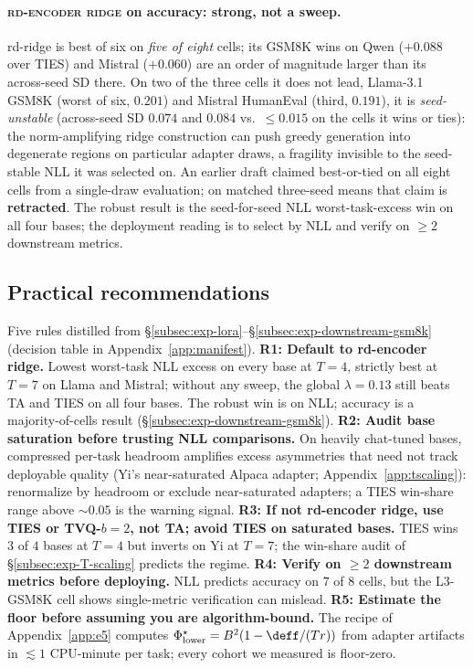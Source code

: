 \paragraph{\textsc{rd-encoder ridge} on accuracy: strong, not a
sweep.} rd-ridge is best of six on \emph{five of eight} cells; its
GSM8K wins on Qwen ($+0.088$ over TIES) and Mistral ($+0.060$) are an
order of magnitude larger than its across-seed SD there. On two of the
three cells it does not lead, Llama-3.1 GSM8K (worst of six,
$0.201$) and Mistral HumanEval (third, $0.191$), it is
\emph{seed-unstable} (across-seed SD $0.074$ and $0.084$ vs.\
$\leq 0.015$ on the cells it wins or ties): the norm-amplifying ridge
construction can push greedy generation into degenerate regions on
particular adapter draws, a fragility invisible to the seed-stable NLL
it was selected on. An earlier draft claimed best-or-tied on all eight
cells from a single-draw evaluation; on matched three-seed means that
claim is \textbf{retracted}. The robust result is the seed-for-seed
NLL worst-task-excess win on all four bases; the deployment reading is
to select by NLL and verify on $\geq 2$ downstream metrics.

\subsection{Practical recommendations}
\label{sec:practical-recommendations}

Five rules distilled from
\S\ref{subsec:exp-lora}--\S\ref{subsec:exp-downstream-gsm8k}
(decision table in Appendix~\ref{app:manifest}).
\textbf{R1: Default to rd-encoder ridge.} Lowest worst-task NLL
excess on every base at $T = 4$, strictly best at $T = 7$ on Llama and
Mistral; without any sweep, the global $\lambda = 0.13$ still beats TA
and TIES on all four bases. The robust
win is on NLL; accuracy is a majority-of-cells result
(\S\ref{subsec:exp-downstream-gsm8k}). \textbf{R2: Audit base saturation before
trusting NLL comparisons.} On heavily chat-tuned bases, compressed
per-task headroom amplifies excess asymmetries that need not track
deployable quality (Yi's near-saturated Alpaca adapter;
Appendix~\ref{app:tscaling}): renormalize by headroom or exclude
near-saturated adapters; a TIES win-share range above $\sim 0.05$ is
the warning signal.
\textbf{R3: If not rd-encoder ridge, use TIES or TVQ-$b{=}2$, not
TA; avoid TIES on saturated bases.} TIES wins $3$ of $4$ bases
at $T = 4$ but inverts on Yi at $T = 7$; the win-share audit of
\S\ref{subsec:exp-T-scaling} predicts the regime.
\textbf{R4: Verify on $\geq 2$ downstream metrics before
deploying.} NLL predicts accuracy on $7$ of $8$ cells, but the
L3-GSM8K cell shows single-metric verification can mislead.
\textbf{R5: Estimate the floor before assuming you are
algorithm-bound.} The recipe of Appendix~\ref{app:e5} computes
$\Phi^\star_{\mathrm{lower}} = B^2(1 - \deff/(Tr))$ from adapter
artifacts in $\lesssim 1$ CPU-minute per task; every cohort we
measured is floor-zero.
